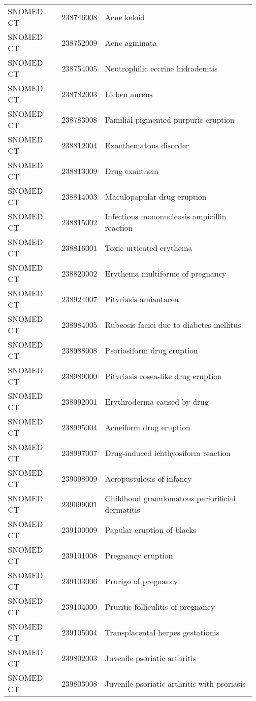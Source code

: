 \begin{longtable}{p{}p{}p{}}
  SNOMED CT & 238746008 & Acne keloid \\ 
  SNOMED CT & 238752009 & Acne agminata \\ 
  SNOMED CT & 238754005 & Neutrophilic eccrine hidradenitis \\ 
  SNOMED CT & 238782003 & Lichen aureus \\ 
  SNOMED CT & 238783008 & Familial pigmented purpuric eruption \\ 
  SNOMED CT & 238812004 & Exanthematous disorder \\ 
  SNOMED CT & 238813009 & Drug exanthem \\ 
  SNOMED CT & 238814003 & Maculopapular drug eruption \\ 
  SNOMED CT & 238815002 & Infectious mononucleosis ampicillin reaction \\ 
  SNOMED CT & 238816001 & Toxic urticated erythema \\ 
  SNOMED CT & 238820002 & Erythema multiforme of pregnancy \\ 
  SNOMED CT & 238924007 & Pityriasis amiantacea \\ 
  SNOMED CT & 238984005 & Rubeosis faciei due to diabetes mellitus \\ 
  SNOMED CT & 238988008 & Psoriasiform drug eruption \\ 
  SNOMED CT & 238989000 & Pityriasis rosea-like drug eruption \\ 
  SNOMED CT & 238992001 & Erythroderma caused by drug \\ 
  SNOMED CT & 238995004 & Acneiform drug eruption \\ 
  SNOMED CT & 238997007 & Drug-induced ichthyosiform reaction \\ 
  SNOMED CT & 239098009 & Acropustulosis of infancy \\ 
  SNOMED CT & 239099001 & Childhood granulomatous periorificial dermatitis \\ 
  SNOMED CT & 239100009 & Papular eruption of blacks \\ 
  SNOMED CT & 239101008 & Pregnancy eruption \\ 
  SNOMED CT & 239103006 & Prurigo of pregnancy \\ 
  SNOMED CT & 239104000 & Pruritic folliculitis of pregnancy \\ 
  SNOMED CT & 239105004 & Transplacental herpes gestationis \\ 
  SNOMED CT & 239802003 & Juvenile psoriatic arthritis \\ 
  SNOMED CT & 239803008 & Juvenile psoriatic arthritis with psoriasis \\ 

\end{longtable}
